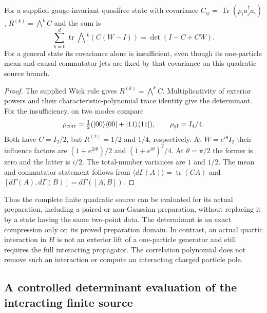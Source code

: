 \documentclass[12pt,a4paper]{article}
\begin{document}
\begin{corollary}
\label{p4c:cor:v247-correlation-determinant-compression}
For a supplied gauge-invariant quasifree state with covariance
$C_{ij}=\operatorname{Tr}(\rho_i a_j^\dagger a_i)$,
$R^{(k)}=\bigwedge^k C$ and the sum is
\[
 \sum_{k=0}^d\operatorname{tr}\bigwedge\!{}^k(C(W-I))
 =\det(I-C+CW).
\]
For a general state its covariance alone is insufficient, even though
its one-particle mean and causal commutator jets are fixed by that
covariance on this quadratic source branch.
\end{corollary}
\begin{proof}
The supplied Wick rule gives $R^{(k)}=\bigwedge^k C$.
Multiplicativity of exterior powers and their characteristic-polynomial
trace identity give the determinant. For the insufficiency, on two
modes compare
\[
 \rho_{\rm corr}=\tfrac12(|00\rangle\langle00|+|11\rangle\langle11|),
 \qquad \rho_{\rm qf}=I_4/4.
\]
Both have $C=I_2/2$, but $R^{(2)}=1/2$ and $1/4$, respectively.
At $W=e^{i\theta}I_2$ their influence factors are
$(1+e^{2i\theta})/2$ and $(1+e^{i\theta})^2/4$.
At $\theta=\pi/2$ the former is zero and the latter is $i/2$.
The total-number variances are $1$ and $1/2$.
The mean and commutator statement follows from
$\langle d\Gamma(A)\rangle=\operatorname{tr}(CA)$ and
$[d\Gamma(A),d\Gamma(B)]=d\Gamma([A,B])$.
\end{proof}

Thus the complete finite quadratic source can be evaluated for its
actual preparation, including a paired or non-Gaussian preparation,
without replacing it by a state having the same two-point data.
The determinant is an exact compression only on its proved preparation
domain. In contrast, an actual quartic interaction in $H$ is not an
exterior lift of a one-particle generator and still requires the full
interacting propagator. The correlation polynomial does not remove
such an interaction or compute an interacting charged particle pole.


\subsection{A controlled determinant evaluation of the interacting finite source}
\label{p4:sec:v248-interacting-determinant-parent}
\end{document}
